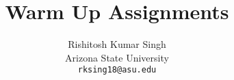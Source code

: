 \documentclass[10pt,twocolumn,letterpaper]{article}
\title{Warm Up Assignments}
\author{Rishitosh Kumar Singh\\
Arizona State University\\
{\tt\small rksing18@asu.edu}
}
\begin{document}
\maketitle



    
    








{
    \small
    
    
}

% 
\end{document}
